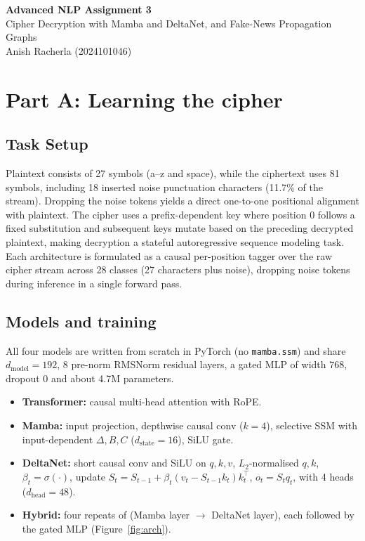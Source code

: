 \documentclass[12pt,a4paper]{article}
\begin{document}
\begin{center}
{\LARGE\bfseries Advanced NLP Assignment 3}\\[4pt]
{\large Cipher Decryption with Mamba and DeltaNet, and Fake-News Propagation Graphs}\\[6pt]
Anish Racherla (2024101046)
\end{center}

\section{Part A: Learning the cipher}

\subsection{Task Setup}

Plaintext consists of 27 symbols (a--z and space), while the ciphertext uses 81 symbols, including 18 inserted noise punctuation characters (11.7\% of the stream). Dropping the noise tokens yields a direct one-to-one positional alignment with plaintext. The cipher uses a prefix-dependent key where position 0 follows a fixed substitution and subsequent keys mutate based on the preceding decrypted plaintext, making decryption a stateful autoregressive sequence modeling task. Each architecture is formulated as a causal per-position tagger over the raw cipher stream across 28 classes (27 characters plus noise), dropping noise tokens during inference in a single forward pass.

\subsection{Models and training}

All four models are written from scratch in PyTorch (no \texttt{mamba.ssm}) and share $d_{\text{model}}{=}192$, 8 pre-norm RMSNorm residual layers, a gated MLP of width 768, dropout 0 and about 4.7M parameters.
\begin{itemize}
\item \textbf{Transformer:} causal multi-head attention with RoPE.
\item \textbf{Mamba:} input projection, depthwise causal conv ($k{=}4$), selective SSM with input-dependent $\Delta,B,C$ ($d_{\text{state}}{=}16$), SiLU gate.
\item \textbf{DeltaNet:} short causal conv and SiLU on $q,k,v$, $L_2$-normalised $q,k$, $\beta_t{=}\sigma(\cdot)$, update $S_t=S_{t-1}+\beta_t(v_t-S_{t-1}k_t)k_t^\top$, $o_t=S_tq_t$, with 4 heads ($d_{\text{head}}{=}48$).
\item \textbf{Hybrid:} four repeats of (Mamba layer $\to$ DeltaNet layer), each followed by the gated MLP (Figure~\ref{fig:arch}).
\end{itemize}
\end{document}

